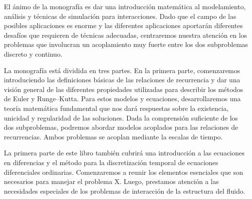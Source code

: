 El ánimo de la monografía es dar una introducción matemática al modelamiento, análisis y técnicas de simulación para interacciones. Dado que el campo de las posibles aplicaciones es enorme y las diferentes aplicaciones aportarán diferentes desafíos que requieren de técnicas adecuadas, centraremos nuestra atención en los problemas que involucran un acoplamiento muy fuerte entre los dos subproblemas discreto y continuo.

La monografía está dividida en tres partes. En la primera parte, comenzaremos introduciendo las definiciones básicas de las relaciones de recurrencia y dar una visión general de las diferentes propiedades utilizadas para describir los métodos de Euler y Runge--Kutta. Para estos modelos y ecuaciones, desarrollaremos una teoría matemática fundamental que nos dará respuestas sobre la existencia, unicidad y regularidad de las soluciones. Dada la comprensión suficiente de los dos subproblemas, podremos abordar modelos acoplados para las relaciones de recurrencias. Ambos problemas se acoplan mediante la escalas de tiempo.

La primera parte de este libro también cubrirá una introducción a las ecuaciones en diferencias y el método para la discretización temporal de ecuaciones diferenciales ordinarias. Comenzaremos a reunir los elementos esenciales que son necesarios para manejar el problema X. Luego, prestamos atención a las necesidades especiales de los problemas de interacción de la estructura del fluido.

